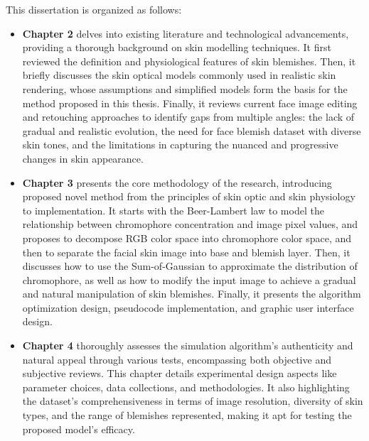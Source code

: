\begin{spacing}{1.5}
This dissertation is organized as follows:
\begin{itemize}
    \item \textbf{Chapter 2} delves into existing literature and technological advancements, providing a thorough background on skin modelling techniques. It first reviewed the definition and physiological features of skin blemishes. Then, it briefly discusses the skin optical models commonly used in realistic skin rendering, whose assumptions and simplified models form the basis for the method proposed in this thesis. Finally, it reviews current face image editing and retouching approaches to identify gaps from multiple angles: the lack of gradual and realistic evolution, the need for face blemish dataset with diverse skin tones, and the limitations in capturing the nuanced and progressive changes in skin appearance.
    \item \textbf{Chapter 3} presents the core methodology of the research, introducing proposed novel method from the principles of skin optic and skin physiology to implementation. It starts with the Beer-Lambert law to model the relationship between chromophore concentration and image pixel values, and proposes to decompose RGB color space into chromophore color space, and then to separate the facial skin image into base and blemish layer. Then, it discusses how to use the Sum-of-Gaussian to approximate the distribution of chromophore, as well as how to modify the input image to achieve a gradual and natural manipulation of skin blemishes. Finally, it presents the algorithm optimization design, pseudocode implementation, and graphic user interface design.
    \item \textbf{Chapter 4} thoroughly assesses the simulation algorithm's authenticity and natural appeal through various tests, encompassing both objective and subjective reviews. This chapter details experimental design aspects like parameter choices, data collections, and methodologies. It also highlighting the dataset's comprehensiveness in terms of image resolution, diversity of skin types, and the range of blemishes represented, making it apt for testing the proposed model's efficacy.

\end{itemize}
\end{spacing}
